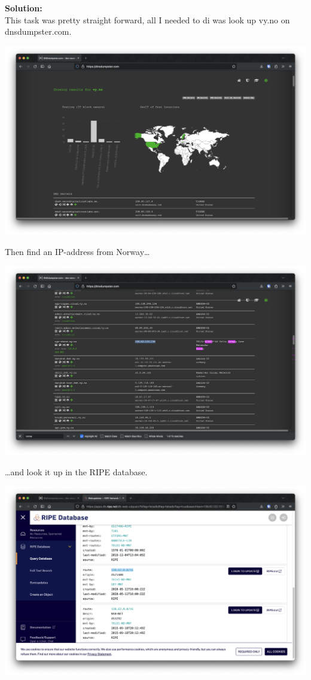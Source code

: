 \textbf{Solution:}\\
This task was pretty straight forward, all I needed to di was look up vy.no on dnsdumpster.com.

\begin{center}
    \includegraphics[width=14cm]{img/Technical information gathering/Vy/Skjermbilde 2023-09-01 kl. 14.56.00.png}
\end{center}

Then find an IP-address from Norway\dots

\begin{center}
    \includegraphics[width=15cm]{img/Technical information gathering/Vy/Skjermbilde 2023-09-01 kl. 14.56.23.png}
\end{center}

\dots and look it up in the RIPE database.

\begin{center}
    \includegraphics[width=15cm]{img/Technical information gathering/Vy/Skjermbilde 2023-09-01 kl. 14.56.50.png}
\end{center}